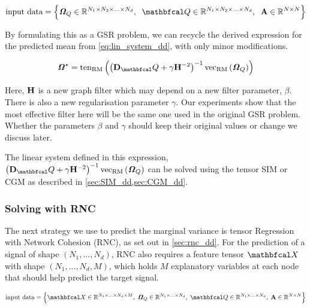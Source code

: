 \begin{equation*}
    \text{input data} = \Big\{\Omegat_Q \in \R^{N_1 \times N_2 \times ... \times N_d}, \;\; \Qt \in \R^{N_1 \times N_2 \times ... \times N_d}, \;\; \A \in \R^{N \times N} \Big\}
\end{equation*}

By formulating this as a GSR problem, we can recycle the derived expression for the predicted mean from \cref{eq:lin_system_dd}, with only minor modifications. 

\begin{equation}
    \Omegat^\star = \tenrm{\left(\D_\Qt + \gamma \HH^{-2}\right)^{-1} \vecrm{\Omegat_Q}}
\end{equation}

Here, $\mathbf{H}$ is a new graph filter which may depend on a new filter parameter, $\beta$. There is also a new regularisation parameter $\gamma$. Our experiments show that the most effective filter here will be the same one used in the original GSR problem. Whether the parameters $\beta$ and $\gamma$ should keep their original values or change we discuss later. 

The linear system defined in this expression, $\left(\D_\Qt + \gamma \HH^{-2}\right)^{-1} \vecrm{\Omegat_Q}$ can be solved using the tensor SIM or CGM as described in \cref{sec:SIM_dd,sec:CGM_dd}. 

\subsubsection{Solving with RNC}

The next strategy we use to predict the marginal variance is tensor Regression with Network Cohesion (RNC), as set out in \cref{sec:rnc_dd}. For the prediction of a signal of shape $(N_1, ..., N_d)$,  RNC also requires a feature tensor $\Xt$ with shape $(N_1, ..., N_d, M)$, which holds $M$ explanatory variables at each node that should help predict the target signal. 


\begin{equation*}
    \text{input data} = \Big\{\Xt \in \R^{N_1 \times ... \times N_d \times M}, \; \Omegat_Q \in \R^{N_1 \times ... \times N_d}, \; \Qt \in \R^{N_1 \times ... \times N_d}, \; \A \in \R^{N \times N} \Big\}
\end{equation*}

